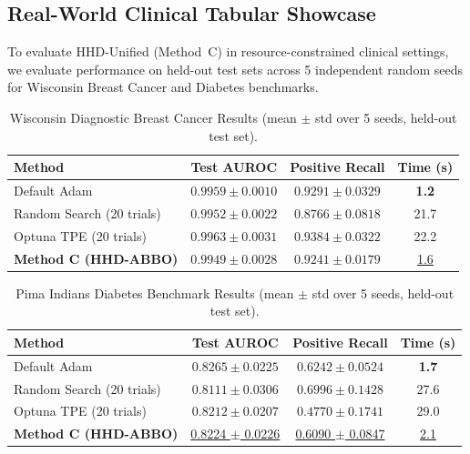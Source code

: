 \subsection{Real-World Clinical Tabular Showcase}

To evaluate HHD-Unified (Method~C) in resource-constrained clinical settings, we evaluate performance on held-out test sets across 5 independent random seeds for Wisconsin Breast Cancer and Diabetes benchmarks.

\begin{table}[H]
\centering
\caption{Wisconsin Diagnostic Breast Cancer Results (mean $\pm$ std over 5 seeds, held-out test set).}
\label{tab:breast_cancer_results_5seed}
\renewcommand{\arraystretch}{1.25}
\begin{tabular}{lccc}
\toprule
\textbf{Method} & \textbf{Test AUROC} & \textbf{Positive Recall} & \textbf{Time (s)} \\
\midrule
Default Adam                      & $0.9959 \pm 0.0010$ & $0.9291 \pm 0.0329$ & \textbf{1.2} \\
Random Search (20 trials)         & $0.9952 \pm 0.0022$ & $0.8766 \pm 0.0818$ & 21.7 \\
Optuna TPE (20 trials)            & $\mathbf{0.9963 \pm 0.0031}$ & $\mathbf{0.9384 \pm 0.0322}$ & 22.2 \\
\textbf{Method C (HHD-ABBO)}      & $0.9949 \pm 0.0028$ & $0.9241 \pm 0.0179$ & \underline{1.6} \\
\bottomrule
\end{tabular}
\end{table}

\begin{table}[H]
\centering
\caption{Pima Indians Diabetes Benchmark Results (mean $\pm$ std over 5 seeds, held-out test set).}
\label{tab:diabetes_results_5seed}
\renewcommand{\arraystretch}{1.25}
\begin{tabular}{lccc}
\toprule
\textbf{Method} & \textbf{Test AUROC} & \textbf{Positive Recall} & \textbf{Time (s)} \\
\midrule
Default Adam                      & $\mathbf{0.8265 \pm 0.0225}$ & $0.6242 \pm 0.0524$ & \textbf{1.7} \\
Random Search (20 trials)         & $0.8111 \pm 0.0306$ & $\mathbf{0.6996 \pm 0.1428}$ & 27.6 \\
Optuna TPE (20 trials)            & $0.8212 \pm 0.0207$ & $0.4770 \pm 0.1741$ & 29.0 \\
\textbf{Method C (HHD-ABBO)}      & \underline{0.8224 $\pm$ 0.0226} & \underline{0.6090 $\pm$ 0.0847} & \underline{2.1} \\
\bottomrule
\end{tabular}
\end{table}

